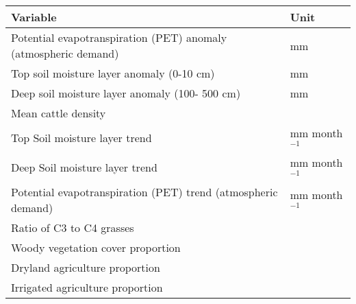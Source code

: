 \documentclass{article}
\begin{document}
\begin{center}
%
%
%
%
%
\begin{center}
\begin{table}[h] \centering



\caption{}
\vspace{-5pt} %

\label{tab }

\end{table}
\end{center}%
\begin{center}
\begin{table}[h] \centering%
\begin{tabular}{ll}
\hline
Variable & Unit \\ \hline
Potential evapotranspiration (PET) anomaly (atmospheric demand) & mm \\ 
Top soil moisture layer anomaly (0-10 cm) & mm \\ 
Deep soil moisture layer anomaly (100- 500 cm) & mm \\ 
Mean cattle density &  \\ 
Top Soil moisture layer trend & mm month$^{-1}$ \\ 
Deep Soil moisture layer trend & mm month$^{-1}$ \\ 
Potential evapotranspiration (PET) trend (atmospheric demand) & mm month$%
^{-1}$ \\ 
Ratio of C3 to C4 grasses &  \\ 
Woody vegetation cover proportion &  \\ 
Dryland agriculture proportion &  \\ 
Irrigated agriculture proportion &  \\ \hline
\end{tabular}%
\caption{}\label{tab}%
\end{table}
\end{center}%
\end{center}
\end{document}
